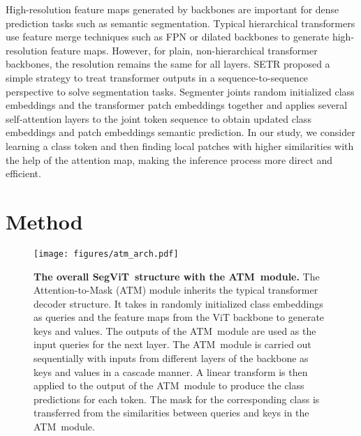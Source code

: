 \documentclass{article}
\makeatletter
\renewcommand{\paragraph}{\@startsection{paragraph}{4}{\z@}{.5ex \@plus 1ex \@minus .2ex}{-1em}{\normalfont\normalsize\bfseries}}
\def\atm{ATM}
\def\seg{SegViT}
\makeatother
\begin{document}
\paragraph{Plain-backbone decoders.}
High-resolution feature maps generated by backbones are important for dense prediction tasks such as semantic segmentation. 
Typical hierarchical transformers use feature merge techniques such as FPN \cite{fpn} or dilated backbones to generate high-resolution feature maps. 
However, for plain, non-hierarchical transformer backbones, the resolution remains the same for all layers. SETR \cite{setr} proposed a simple strategy to treat transformer outputs in a sequence-to-sequence perspective to solve segmentation tasks. 
Segmenter \cite{strudel2021segmenter} 
joints random initialized class embeddings and the transformer patch embeddings together and applies several  self-attention layers to the joint token sequence 
 to obtain updated class embeddings and patch embeddings semantic prediction.
In our study, we consider learning a class token and then finding local patches with higher similarities with the help of the attention map, making the inference process more direct and efficient. 



\section{Method}
\begin{figure}
    \centering
    
    \texttt{[image: figures/atm\_arch.pdf]}
    \caption{\textbf{The overall \seg\ structure with the \atm\ module.}
    The Attention-to-Mask (\atm) module  inherits the typical transformer decoder structure. It takes in  randomly initialized class embeddings as queries and the feature maps from the ViT backbone to generate keys and values. The outputs of the \atm\ module are used as the input queries for the next layer.
    The \atm\ module is carried out sequentially with inputs from different layers of the backbone as keys and values in a cascade manner. 
    A linear transform is then applied to the output of the 
    \atm\ module to produce the class predictions for each token. The mask for the corresponding class is transferred from the similarities between queries and keys in the \atm\ module.
    }
    \label{fig:atm_decoder}
\end{figure}
\end{document}
